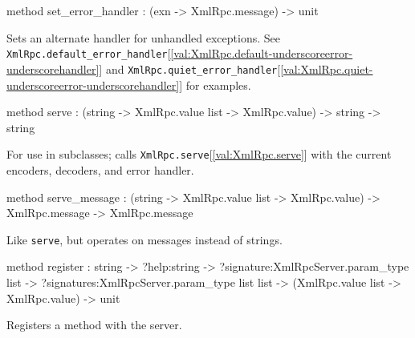 \documentclass[11pt]{article}
\begin{document}
\begin{ocamldocobjectend}
\begin{ocamldocdescription}
\end{ocamldocdescription}


\label{method:XmlRpcServer.base.set-underscoreerror-underscorehandler}\begin{ocamldoccode}
method set_error_handler : (exn -> XmlRpc.message) -> unit
\end{ocamldoccode}
\begin{ocamldocdescription}
Sets an alternate handler for unhandled exceptions.
      See {\tt{XmlRpc.default\_error\_handler}}[\ref{val:XmlRpc.default-underscoreerror-underscorehandler}] and
      {\tt{XmlRpc.quiet\_error\_handler}}[\ref{val:XmlRpc.quiet-underscoreerror-underscorehandler}] for examples.


\end{ocamldocdescription}


\label{method:XmlRpcServer.base.serve}\begin{ocamldoccode}
method serve :
  (string -> XmlRpc.value list -> XmlRpc.value) -> string -> string
\end{ocamldoccode}
\begin{ocamldocdescription}
For use in subclasses; calls {\tt{XmlRpc.serve}}[\ref{val:XmlRpc.serve}] with the current
      encoders, decoders, and error handler.


\end{ocamldocdescription}


\label{method:XmlRpcServer.base.serve-underscoremessage}\begin{ocamldoccode}
method serve_message :
  (string -> XmlRpc.value list -> XmlRpc.value) ->
  XmlRpc.message -> XmlRpc.message
\end{ocamldoccode}
\begin{ocamldocdescription}
Like {\tt{serve}}, but operates on messages instead of strings.


\end{ocamldocdescription}


\label{method:XmlRpcServer.base.register}\begin{ocamldoccode}
method register :
  string ->
  ?help:string ->
  ?signature:XmlRpcServer.param_type list ->
  ?signatures:XmlRpcServer.param_type list list ->
  (XmlRpc.value list -> XmlRpc.value) -> unit
\end{ocamldoccode}
\begin{ocamldocdescription}
Registers a method with the server.



\end{ocamldocdescription}
\end{ocamldocobjectend}
\end{document}
